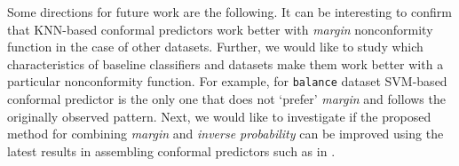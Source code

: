 Some directions for future work are the following. It can be interesting to confirm that KNN-based
conformal predictors work better with \textit{margin} nonconformity function in the case of other 
datasets. Further, we would like to study which characteristics of baseline classifiers and
datasets make them work better with a particular nonconformity function. For example, for
\verb|balance| dataset SVM-based conformal predictor is the only one that does not `prefer'
\textit{margin} and follows the originally observed pattern. Next, we would like to investigate 
if the proposed method for combining \textit{margin} and \textit{inverse probability} can be improved
using the latest results in assembling conformal predictors such as in \citep{toccaceli2019conformal}. 


    
    
    
